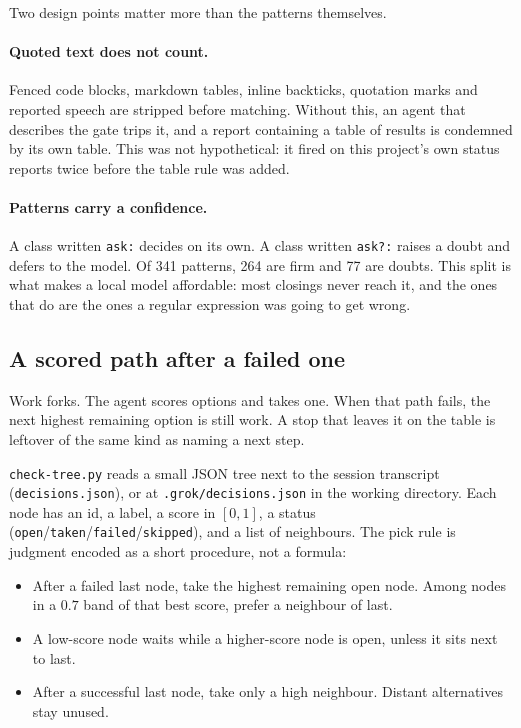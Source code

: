 Two design points matter more than the patterns themselves.

\paragraph{Quoted text does not count.} Fenced code blocks, markdown tables,
inline backticks, quotation marks and reported speech are stripped before
matching. Without this, an agent that describes the gate trips it, and a report
containing a table of results is condemned by its own table. This was not
hypothetical: it fired on this project's own status reports twice before the
table rule was added.

\paragraph{Patterns carry a confidence.} A class written \texttt{ask:} decides
on its own. A class written \texttt{ask?:} raises a doubt and defers to the
model. Of 341 patterns, 264 are firm and 77 are doubts. This split is what makes
a local model affordable: most closings never reach it, and the ones that do are
the ones a regular expression was going to get wrong.

\subsection{A scored path after a failed one}
\label{sec:tree-system}

Work forks. The agent scores options and takes one. When that path
fails, the next highest remaining option is still work. A stop that
leaves it on the table is leftover of the same kind as naming a next
step.

\texttt{check-tree.py} reads a small JSON tree next to the session
transcript (\texttt{decisions.json}), or at
\texttt{.grok/decisions.json} in the working directory. Each node has
an id, a label, a score in $[0,1]$, a status
(\texttt{open}/\texttt{taken}/\texttt{failed}/\texttt{skipped}), and a
list of neighbours. The pick rule is judgment encoded as a short
procedure, not a formula:

\begin{itemize}
  \item After a failed last node, take the highest remaining open
        node. Among nodes in a $0.7$ band of that best score, prefer a
        neighbour of last.
  \item A low-score node waits while a higher-score node is open,
        unless it sits next to last.
  \item After a successful last node, take only a high neighbour.
        Distant alternatives stay unused.
\end{itemize}

